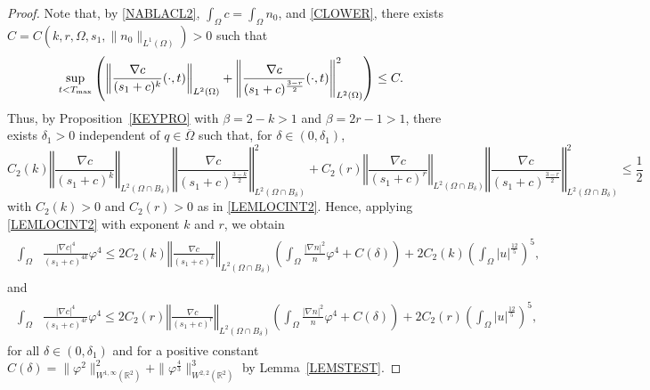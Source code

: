 \documentclass{amsart}
\numberwithin{equation}{section}
\newcommand{\R}{{ \mathbb{R}  }}
\newcommand{\bke}[1]{\left( #1 \right)}
\newcommand{\norm}[1]{\left\Vert #1 \right\Vert}
\begin{document}
\begin{proof}
Note that, by \eqref{NABLACL2},
$\int_{\Omega}c=\int_{\Omega}n_{0}$, and \eqref{CLOWER}, there exists  $C=C(k, r, \Omega, s_1, \|n_0\|_{L^1(\Omega)})>0$   such that
\begin{equation}\label{FEB10}
\sup_{t<T_{\rm max}}\bke{\norm{\frac{\nabla c}{(s_{1}+c)^{k}}(\cdot,t)}_{L^{2}(\Omega)}+\norm{\frac{\nabla c}{(s_{1}+c)^{\frac{3-r}{2}}}(\cdot,t)}_{L^{2}(\Omega)}^{2}}\le C.
\end{equation}
Thus, by Proposition~\ref{KEYPRO} with $\beta= 2-k >1$ and $\beta=2r-1>1$, there exists $\delta_{1}>0$ independent of $q\in\overline{\Omega}$ such that, for $\delta\in (0, \delta_{1})$,
\[
 C_{2}(k)\norm{\frac{\nabla c}{(s_{1}+c)^{k}}}_{L^{2}(\Omega\cap B_{\delta})} \norm{\frac{\nabla c}{(s_{1}+c)^{\frac{3-k}{2}}}}_{L^{2}(\Omega\cap B_{\delta})}^{2}  +C_{2}(r)\norm{\frac{\nabla c}{(s_{1}+c)^{r}}}_{L^{2}(\Omega\cap B_{\delta})} \norm{\frac{\nabla c}{(s_{1}+c)^{\frac{3-r}{2}}}}_{L^{2}(\Omega\cap B_{\delta})}^{2}  \le \frac{1}{2}
\]
with $C_2 (k) >0$ and $C_2 (r) >0$ as in \eqref{LEMLOCINT2}.
Hence, applying \eqref{LEMLOCINT2} with exponent $k$ and $r$, we obtain 
\begin{align}\label{LEMLOCINT11}
\begin{aligned} 
 \int_{\Omega} &\frac{|\nabla c|^{4}}{(s_{1}+c)^{4k}}\varphi^{4}
   \le
   2C_{2}(k)\norm{\frac{\nabla c}{(s_{1}+c)^{k}}}_{L^{2}(\Omega\cap B_{\delta})}
\bke{   \int_{\Omega} \frac{|\nabla n|^{2}}{n}\varphi^{4}   + C(\delta) }
+2C_{2}(k)\bke{\int_{\Omega}|u|^{\frac{12}{5}} }^{5},
\end{aligned}
\end{align}
and
\begin{align}\label{LEMLOCINT12}
\begin{aligned} 
 \int_{\Omega} &\frac{|\nabla c|^{4}}{(s_{1}+c)^{4r}}\varphi^{4}
   \le
   2C_{2}(r)\norm{\frac{\nabla c}{(s_{1}+c)^{r}}}_{L^{2}(\Omega\cap B_{\delta})}
\bke{   \int_{\Omega} \frac{|\nabla n|^{2}}{n}\varphi^{4}   +C(\delta)}
+2C_{2}(r)\bke{\int_{\Omega}|u|^{\frac{12}{5}} }^{5},
\end{aligned}
\end{align}
for all $\delta \in (0, \delta_1)$ and for a positive constant $C(\delta)= \| \varphi^{2}  \|_{W^{1,\infty}(\R^{2})}^{2}  +\|\varphi^{\frac{4}{3}}\|_{W^{2,2}(\R^{2})}^{3}$ by Lemma~\ref{LEMSTEST}. 

\end{proof}
\end{document}

